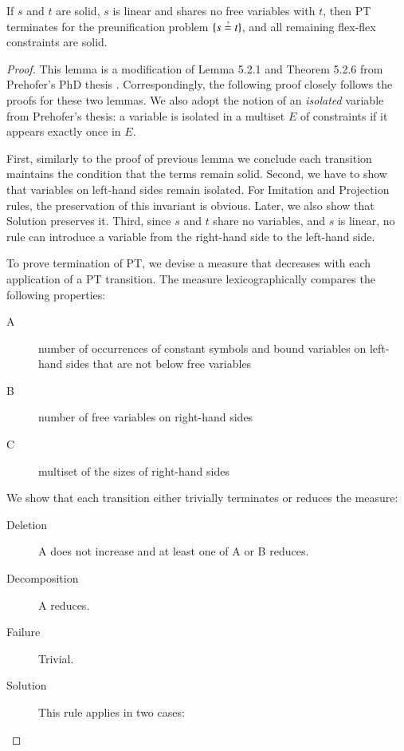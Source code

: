 \begin{lemma}
  \label{unif:lemma:solid-termination-preunif}
  If $s$ and $t$ are solid, $s$ is linear and shares no free variables with $t$, then
  PT terminates for the preunification problem $\{ s \unif t \}$, and
  all remaining flex-flex constraints are solid.
\end{lemma}
\begin{proof}
  This lemma is a modification of Lemma 5.2.1 and Theorem 5.2.6 from Prehofer's
  PhD thesis \cite{cp-95-unifphd}. Correspondingly, the following proof closely
  follows the proofs for these two lemmas. We also adopt the notion of an
  \emph{isolated} variable from Prehofer's thesis: a variable is isolated in a
  multiset $E$ of constraints if it appears exactly once in $E$.

  First, similarly to the proof of previous lemma we conclude each transition
  maintains the condition that the terms remain solid. Second, we have to show
  that variables on left-hand sides remain isolated. For \textsf{Imitation} and
  \textsf{Projection} rules, the preservation of this invariant is obvious.
  Later, we also show that \textsf{Solution} preserves it. Third, since $s$ and
  $t$ share no variables, and $s$ is linear, no rule can introduce a variable
  from the right-hand side to the left-hand side.
  
  To prove termination of PT, we devise a measure that
  decreases with each application of a PT transition. The measure
  lexicographically compares the following properties:
  \begin{description}
    \item[A] number of occurrences of constant symbols and bound variables on left-hand sides that
    are not below free variables
    \item[B] number of free variables on right-hand sides
    \item[C] multiset of the sizes of right-hand sides
  \end{description}
  
  We show that each transition either trivially terminates or reduces the measure:
  \begin{description}
    \item[Deletion] A does not increase and at least one of A or B reduces.
    \item[Decomposition] A reduces.
    \item[Failure] Trivial. 
    \item[Solution] This rule applies in two cases:


\end{description}
\end{proof}
